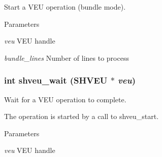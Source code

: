Start a VEU operation (bundle mode). 


\begin{DoxyParams}{Parameters}
\item[{\em veu}]VEU handle \item[{\em bundle\_\-lines}]Number of lines to process \end{DoxyParams}
\subsubsection[{shveu\_\-wait}]{\setlength{\rightskip}{0pt plus 5cm}int shveu\_\-wait (SHVEU $\ast$ {\em veu})}\label{veu__colorspace_8h_a7d6f7be4ff85d5dab1d8d0f7a080fb39}


Wait for a VEU operation to complete. 

The operation is started by a call to shveu\_\-start. 
\begin{DoxyParams}{Parameters}
\item[{\em veu}]VEU handle \end{DoxyParams}
